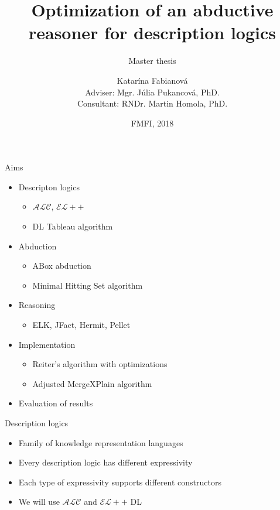 \documentclass{beamer}
\title{Optimization of an abductive reasoner for description logics}
\subtitle{Master thesis}
\author{Katarína Fabianová \\ Adviser: Mgr. Júlia Pukancová, PhD. \\ Consultant:  RNDr. Martin Homola, PhD.}
\date{FMFI, 2018}
\begin{document}
\begin{frame}
  \titlepage
\end{frame}



\begin{frame}{Aims}
	\begin{itemize}		
		\item {
			Descripton logics
			\begin{itemize}
				\item $\mathcal{ALC}$, $\mathcal{EL{+}{+}}$
				\item DL Tableau algorithm
			\end{itemize}
		}
				
		\item {
			Abduction
			\begin{itemize}
				\item ABox abduction
				\item Minimal Hitting Set algorithm
			\end{itemize}
		}

		\item {
			Reasoning
			\begin{itemize}
				\item ELK, JFact, Hermit, Pellet
			\end{itemize}
		}
												
		\item {
			Implementation
			\begin{itemize}
				\item Reiter's algorithm with optimizations
				\item Adjusted MergeXPlain algorithm
			\end{itemize}
		}

		\item {
			Evaluation of results
		}		
	\end{itemize}
\end{frame}


\begin{frame}{Description logics}
  \begin{itemize}
	\item {
		Family of knowledge representation languages
	}
	
	\item {
		Every description logic has different expressivity
	}
	
	\item {
		Each type of expressivity supports different constructors
	}
	
	\item {
		We will use $\mathcal{ALC}$ and $\mathcal{EL{+}{+}}$ DL
	}

  \end{itemize}
\end{frame}
\end{document}
